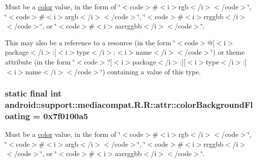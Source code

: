 Must be a \hyperlink{classandroid_1_1support_1_1mediacompat_1_1_r_1_1color}{color} value, in the form of \char`\"{}$<$code$>$\#$<$i$>$rgb$<$/i$>$$<$/code$>$\char`\"{}, \char`\"{}$<$code$>$\#$<$i$>$argb$<$/i$>$$<$/code$>$\char`\"{}, \char`\"{}$<$code$>$\#$<$i$>$rrggbb$<$/i$>$$<$/code$>$\char`\"{}, or \char`\"{}$<$code$>$\#$<$i$>$aarrggbb$<$/i$>$$<$/code$>$\char`\"{}. 

This may also be a reference to a resource (in the form \char`\"{}$<$code$>$@\mbox{[}$<$i$>$package$<$/i$>$:\mbox{]}$<$i$>$type$<$/i$>$:$<$i$>$name$<$/i$>$$<$/code$>$\char`\"{}) or theme attribute (in the form \char`\"{}$<$code$>$?\mbox{[}$<$i$>$package$<$/i$>$:\mbox{]}\mbox{[}$<$i$>$type$<$/i$>$:\mbox{]}$<$i$>$name$<$/i$>$$<$/code$>$\char`\"{}) containing a value of this type. \hypertarget{classandroid_1_1support_1_1mediacompat_1_1_r_1_1attr_364f647f9c67ba392b936f9dcc5d49c6}{
\subsubsection[{colorBackgroundFloating}]{\setlength{\rightskip}{0pt plus 5cm}static final int android::support::mediacompat.R.R::attr::colorBackgroundFloating = 0x7f0100a5}}
\label{classandroid_1_1support_1_1mediacompat_1_1_r_1_1attr_364f647f9c67ba392b936f9dcc5d49c6}


Must be a \hyperlink{classandroid_1_1support_1_1mediacompat_1_1_r_1_1color}{color} value, in the form of \char`\"{}$<$code$>$\#$<$i$>$rgb$<$/i$>$$<$/code$>$\char`\"{}, \char`\"{}$<$code$>$\#$<$i$>$argb$<$/i$>$$<$/code$>$\char`\"{}, \char`\"{}$<$code$>$\#$<$i$>$rrggbb$<$/i$>$$<$/code$>$\char`\"{}, or \char`\"{}$<$code$>$\#$<$i$>$aarrggbb$<$/i$>$$<$/code$>$\char`\"{}. 

